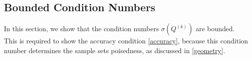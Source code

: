 \documentclass{article}
\newenvironment{comment}
  {\par\medskip
   \color{red}%
   \begin{framed}
   \textbf{Comment: }\ignorespaces}
 {\end{framed}
  \medskip}
\theoremstyle{case}
\numberwithin{theorem}{subsection}
\newcommand{\feasible}{{\mathcal F}}
\newcommand{\gradf}{\nabla f}
\newcommand{\lipgrad}{{L_{\nabla}}}
\newcommand{\maxgrad}{{M_{\nabla}}}
\newcommand{\maxhessian}{{M_{\nabla^2}}}
\newcommand{\maxnorm}{{M_{\|\cdot\|}}}
\newcommand{\qk}{{Q^{(k)}}}
\newcommand{\xinit}{{x^{(0)}}}
\begin{document}
% 


% 



\subsection{Bounded Condition Numbers}
\label{bounded_condition_numbers}
In this section, we show that the condition numbers $\sigma(\qk)$ are bounded.
This is required to show the accuracy condition \cref{accuracy}, because this condition number determines the sample sets poisedness, as discussed in \cref{geometry}.
\end{document}
